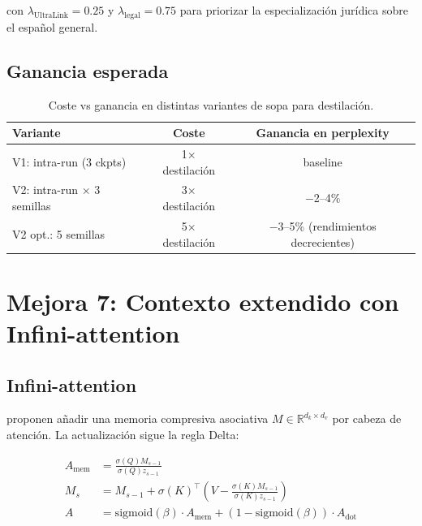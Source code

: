 \documentclass[11pt,a4paper]{article}
\begin{document}
con $\lambda_{\text{UltraLink}}=0.25$ y $\lambda_{\text{legal}}=0.75$ para priorizar
la especialización jurídica sobre el español general.

\subsection{Ganancia esperada}

\begin{table}[h]
\centering
\caption{Coste vs ganancia en distintas variantes de sopa para destilación.}
\label{tab:soup}
\begin{tabular}{lcc}
\toprule
\textbf{Variante} & \textbf{Coste} & \textbf{Ganancia en perplexity} \\
\midrule
V1: intra-run (3 ckpts)  & 1$\times$ destilación & baseline \\
V2: intra-run $\times$ 3 semillas & 3$\times$ destilación & $-$2--4\% \\
V2 opt.: 5 semillas & 5$\times$ destilación & $-$3--5\% (rendimientos decrecientes) \\
\bottomrule
\end{tabular}
\end{table}

\section{Mejora 7: Contexto extendido con Infini-attention}
\label{sec:infini}

\subsection{Infini-attention}

\citet{munkhdalai2024leave} proponen añadir una memoria compresiva asociativa
$M \in \mathbb{R}^{d_k \times d_v}$ por cabeza de atención. La actualización sigue
la regla Delta:

\begin{align}
  A_{\text{mem}} &= \frac{\sigma(Q) M_{s-1}}{\sigma(Q) z_{s-1}} \\
  M_s &= M_{s-1} + \sigma(K)^\top \left(V - \frac{\sigma(K) M_{s-1}}{\sigma(K) z_{s-1}}\right) \\
  A &= \text{sigmoid}(\beta) \cdot A_{\text{mem}} + (1 - \text{sigmoid}(\beta)) \cdot A_{\text{dot}}
\end{align}
\end{document}
